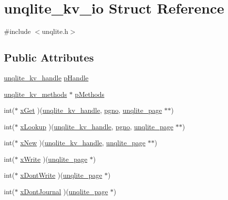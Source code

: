 \hypertarget{structunqlite__kv__io}{\section{unqlite\-\_\-kv\-\_\-io Struct Reference}
\label{dd/dc2/structunqlite__kv__io}
}


{\ttfamily \#include $<$unqlite.\-h$>$}

\subsection*{Public Attributes}
\begin{DoxyCompactItemize}
\item 
\hyperlink{unqlite_8c_acf43c872ce33c957ad333352b40cd69e}{unqlite\-\_\-kv\-\_\-handle} \hyperlink{structunqlite__kv__io_a70e85cd52db1f24484d50c78f947f423}{p\-Handle}
\item 
\hyperlink{structunqlite__kv__methods}{unqlite\-\_\-kv\-\_\-methods} $\ast$ \hyperlink{structunqlite__kv__io_a62f6d1c246e5b6f45d27242eb6d9e95b}{p\-Methods}
\item 
int($\ast$ \hyperlink{structunqlite__kv__io_aab20ca264415007594e1fea805db114d}{x\-Get} )(\hyperlink{unqlite_8c_acf43c872ce33c957ad333352b40cd69e}{unqlite\-\_\-kv\-\_\-handle}, \hyperlink{unqlite_8c_a90bf132c9229151f7c29e84e592907cd}{pgno}, \hyperlink{structunqlite__page}{unqlite\-\_\-page} $\ast$$\ast$)
\item 
int($\ast$ \hyperlink{structunqlite__kv__io_a137d8b0528c7ea4089b38513ad359858}{x\-Lookup} )(\hyperlink{unqlite_8c_acf43c872ce33c957ad333352b40cd69e}{unqlite\-\_\-kv\-\_\-handle}, \hyperlink{unqlite_8c_a90bf132c9229151f7c29e84e592907cd}{pgno}, \hyperlink{structunqlite__page}{unqlite\-\_\-page} $\ast$$\ast$)
\item 
int($\ast$ \hyperlink{structunqlite__kv__io_a6ce80d5a9bc385aa3f5281c1ea98f447}{x\-New} )(\hyperlink{unqlite_8c_acf43c872ce33c957ad333352b40cd69e}{unqlite\-\_\-kv\-\_\-handle}, \hyperlink{structunqlite__page}{unqlite\-\_\-page} $\ast$$\ast$)
\item 
int($\ast$ \hyperlink{structunqlite__kv__io_a7e37a4e64daa4db394bc3b72a5c4085d}{x\-Write} )(\hyperlink{structunqlite__page}{unqlite\-\_\-page} $\ast$)
\item 
int($\ast$ \hyperlink{structunqlite__kv__io_a81996f6ecee4cfb81285f2815cf99510}{x\-Dont\-Write} )(\hyperlink{structunqlite__page}{unqlite\-\_\-page} $\ast$)
\item 
int($\ast$ \hyperlink{structunqlite__kv__io_ae36240879b4363f2a03c769801f20dff}{x\-Dont\-Journal} )(\hyperlink{structunqlite__page}{unqlite\-\_\-page} $\ast$)
$$
\end{DoxyCompactItemize}
